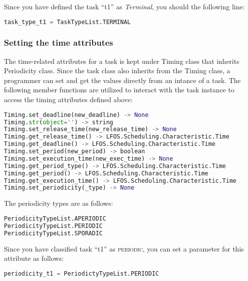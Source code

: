 \documentclass[]{scrartcl}
\begin{document}
                
Since you have defined the task ``t1'' as \emph{Terminal}, you should the following line:

\begin{lstlisting}[language=Python, frame=single, label={lst:TaskTypeInstt1}, caption={Terminal task type definition.}]
task_type_t1 = TaskTypeList.TERMINAL
\end{lstlisting}
        
        
\subsubsection{Setting the time attributes}
The time-related attributes for a task is kept under \textsf{Timing} class that inherits \textsf{Periodicity} class. Since the task class also inherits from the Timing class, a programmer can set and get the values directly
from an intance of a task. The following member functions are utilized to interact with the task instance to access the timing attributes defined above:

\begin{lstlisting}[language=Python, frame=single, label={lst:t1memberFunctionsTiming}, caption={The member functions for \textsf{Timing} module.}]
Timing.set_deadline(new_deadline) -> None
Timing.str(object='') -> string
Timing.set_release_time(new_release_time) -> None
Timing.get_release_time() -> LFOS.Scheduling.Characteristic.Time
Timing.get_deadline() -> LFOS.Scheduling.Characteristic.Time
Timing.set_period(new_period) -> boolean
Timing.set_execution_time(new_exec_time) -> None
Timing.get_period_type() -> LFOS.Scheduling.Characteristic.Time
Timing.get_period() -> LFOS.Scheduling.Characteristic.Time
Timing.get_execution_time() -> LFOS.Scheduling.Characteristic.Time
Timing.set_periodicity(_type) -> None
\end{lstlisting}
        

The periodicity types are as follows:

\begin{lstlisting}[language=Python, frame=single, label={lst:t1PerioidictyTypeList}, caption={The \textsf{Periodicity} type enumeration.}]
PeriodicityTypeList.APERIODIC
PeriodicityTypeList.PERIODIC
PeriodicityTypeList.SPORADIC
\end{lstlisting}
        
        
Since you have classified task ``t1'' as \textsc{periodic}, you can set a parameter for this attribute as follows:
        

\begin{lstlisting}[language=Python, frame=single, label={lst:t1periodicitySetting}, caption={Periodicity for parameter is stored in the variable to use it later in instantiation.}]
periodicity_t1 = PeriodictyTypeList.PERIODIC
\end{lstlisting}
        
\end{document}
